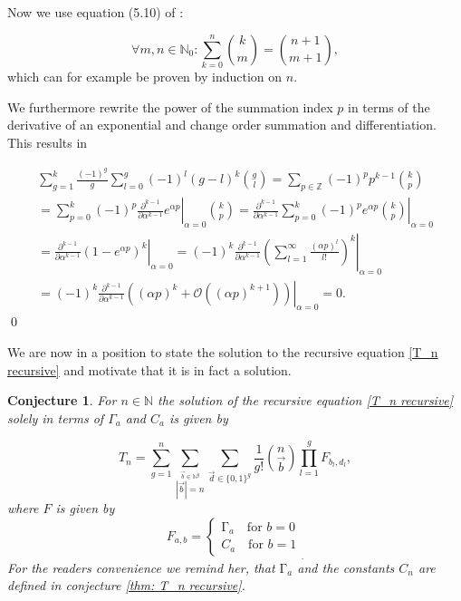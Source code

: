 \documentclass[b5paper,draft,openbib,12pt]{memoir}
\newtheorem{Conj}[Def]{Conjecture}
\begin{document}
Now we use equation (5.10) of \cite{graham1994concrete}:

\begin{equation}\tag{upper summation}
\forall m,n\in\mathbb{N}_0: \sum_{k=0}^n \binom{k}{m} = \binom{n+1}{m+1},
\end{equation}
which can for example be proven by induction on \(n\).

We furthermore rewrite the power of the summation index \(p\) in terms of the derivative of an 
exponential and change order summation and differentiation. This results in

\begin{multline*}
\sum_{g=1}^k \frac{(-1)^g}{g} \sum_{l=0}^g (-1)^l (g-l)^k \binom{g}{l}
=\sum_{p\in\mathbb{Z}} (-1)^{p} p^{k-1}  \binom{k}{p}\\
=\sum_{p=0}^k (-1)^{p} \left. \frac{\partial^{k-1}}{\partial \alpha^{k-1}} e^{\alpha p}\right|_{\alpha=0}  \binom{k}{p}
=\left. \frac{\partial^{k-1}}{\partial \alpha^{k-1}}  \sum_{p=0}^k (-1)^{p} e^{\alpha p} \binom{k}{p}\right|_{\alpha=0} \\
=\left. \frac{\partial^{k-1}}{\partial \alpha^{k-1}}  \left( 1-e^{\alpha p}\right)^k \right|_{\alpha=0} 
=(-1)^k \left. \frac{\partial^{k-1}}{\partial \alpha^{k-1}} \left( \sum_{l=1}^\infty \frac{(\alpha p)^l}{l!} \right) ^k \right|_{\alpha=0} \\
=(-1)^k \left. \frac{\partial^{k-1}}{\partial \alpha^{k-1}} ((\alpha p)^k + \mathcal{O} ((\alpha p)^{k+1}) ) \right|_{\alpha=0} =0.
\end{multline*}
\qed




We are now in a position to state the solution to the recursive equation \eqref{T_n recursive}
and motivate that it is in fact a solution. 

\begin{Conj}
For \(n\in\mathbb{N}\) the solution of the recursive equation \eqref{T_n recursive} 
solely in terms of \(\Gamma_a\) and \(C_a\) is given by

\begin{equation}\label{recursive solution}
T_n = \sum_{g=1}^n \sum_{\stackrel{\vec{b}\in\mathbb{N}^g}{|\vec{b}|= n}} \sum_{\vec{d}\in {\{0,1\}}^g} 
\frac{1}{g!} \binom{n}{\vec{b}} \prod_{l=1}^g F_{b_l,d_l},
\end{equation}
where \(F\) is given by
\begin{equation}\label{eq resursive weak solution}
F_{a,b} = \left\{ \begin{matrix}\mathrm\Gamma_a \quad \text{for } b=0 \\ C_a \quad \text{for } b=1  \end{matrix} \right._. 
\end{equation}
For the readers convenience we remind her, that \(\mathrm\Gamma_a\) and
the constants \(C_n\) are defined in conjecture \ref{thm: T_n recursive}. 
\end{Conj}
\end{document}
